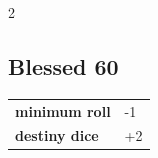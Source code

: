 \begin{multicols}{2}
\begin{tcolorbox}
\end{tcolorbox}

\begin{tcolorbox}
    \subsection*{Blessed \hfill \small{60 }}
    \tcblower




\begin{tabular}{@{}ll@{}}
    \textbf{minimum roll} & -1\\
    \textbf{destiny dice} & +2\\
\end{tabular}


\end{tcolorbox}

\end{multicols}